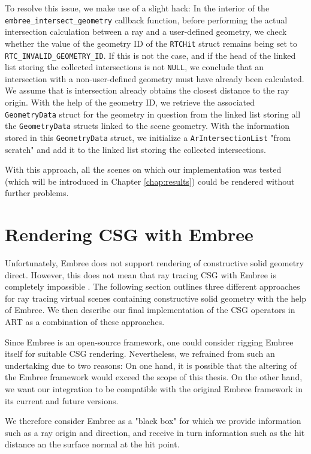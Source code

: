 To resolve this issue, we make use of a slight hack: In the interior of the \texttt{embree\_intersect\_geometry} callback function, before performing the actual intersection calculation between a ray and a user-defined geometry, we check whether the value of the geometry ID of the \texttt{RTCHit} struct remains being set to \texttt{RTC\_INVALID\_GEOMETRY\_ID}. If this is not the case, and if the head of the linked list storing the collected intersections is not \texttt{NULL}, we conclude that an intersection with a non-user-defined geometry must have already been calculated. We assume that is intersection already obtains the closest distance to the ray origin. With the help of the geometry ID, we retrieve the associated \texttt{GeometryData} struct for the geometry in question from the linked list storing all the \texttt{GeometryData} structs linked to the scene geometry. With the information stored in this \texttt{GeometryData} struct, we initialize a \texttt{ArIntersectionList} "from scratch" and add it to the linked list storing the collected intersections.

With this approach, all the scenes on which our implementation was tested (which will be introduced in Chapter \ref{chap:results}) could be rendered without further problems.


\section{Rendering CSG with Embree}
\label{sec:embree_csg}

Unfortunately, Embree does not support rendering of constructive solid geometry direct. However, this does not mean that ray tracing CSG with Embree is completely impossible . The following section outlines three different approaches for ray tracing virtual scenes containing constructive solid geometry with the help of Embree. We then describe our final implementation of the CSG operators in ART as a combination of these approaches.

Since Embree is an open-source framework, one could consider rigging Embree itself for suitable CSG rendering. Nevertheless, we refrained from such an undertaking due to two reasons: On one hand, it is possible that the altering of the Embree framework would exceed the scope of this thesis. On the other hand, we want our integration to be compatible with the original Embree framework in its current and future versions. 

We therefore consider Embree as a "black box" for which we provide information such as a ray origin and direction, and receive in turn information such as the hit distance an the surface normal at the hit point.


